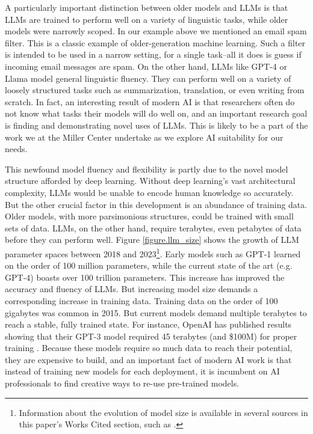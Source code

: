 \documentclass[12pt, oneside]{article}   	%
\begin{document}
A particularly important distinction between older models and LLMs is that LLMs are trained to perform well on a variety of linguistic tasks, while older models were narrowly scoped.  In our example above we mentioned an email spam filter.  This is a classic example of older-generation machine learning.  Such a filter is intended to be used in a narrow setting, for a single task--all it does is guess if incoming email messages are spam.  On the other hand, LLMs like GPT-4 or Llama model general linguistic fluency.  They can perform well on a variety of loosely structured tasks such as summarization, translation, or even writing from scratch.  In fact, an interesting result of modern AI is that researchers often do not know what tasks their models will do well on, and an important research goal is finding and demonstrating novel uses of LLMs.  This is likely to be a part of the work we at the Miller Center undertake as we explore AI suitability for our needs.

This newfound model fluency and flexibility is partly due to the novel model structure afforded by deep learning.  Without deep learning’s vast architectural complexity, LLMs would be unable to encode human knowledge so accurately.  But the other crucial factor in this development is an abundance of training data.  Older models, with more parsimonious structures, could be trained with small sets of data.  LLMs, on the other hand, require terabytes, even petabytes of data before they can perform well.  Figure \ref{figure.llm_size} shows the growth of LLM parameter spaces between 2018 and 2023\footnote{Information about the evolution of model size is available in several sources in this paper’s Works Cited section, such as \cite{shazeer:2017, wei:2022}.}.  Early models such as GPT-1 learned on the order of 100 million parameters, while the current state of the art (e.g. GPT-4) boasts over 100 trillion parameters.  This increase has improved the accuracy and fluency of LLMs.  But increasing model size demands a corresponding increase in training data.  Training data on the order of 100 gigabytes was common in 2015.  But current models demand multiple terabytes to reach a stable, fully trained state.  For instance, OpenAI has published results showing that their GPT-3 model required 45 terabytes (and \$100M) for proper training \cite{brown:2020}. Because these models require so much data to reach their potential, they are expensive to build, and an important fact of modern AI work is that instead of training new models for each deployment, it is incumbent on AI professionals to find creative ways to re-use pre-trained models.
\end{document}
